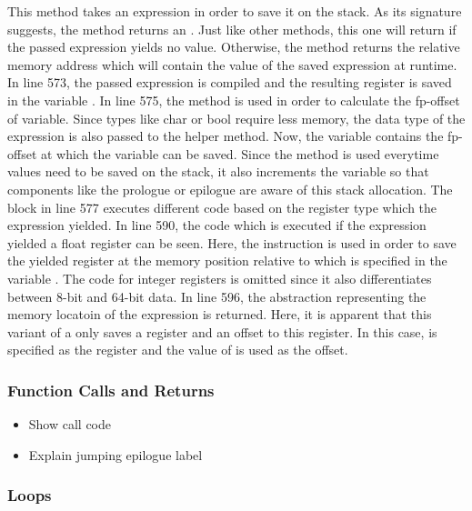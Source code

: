 This method takes an expression in order to save it on the stack.
As its signature suggests, the method returns an .
Just like other methods, this one will return  if the passed expression yields no value.
Otherwise, the method returns the relative memory address which will contain the value of the saved expression at runtime.
In line 573, the passed expression is compiled and the resulting register is saved in the variable .
In line 575, the  method is used in order to calculate the fp-offset of variable.
Since types like char or bool require less memory, the data type of the expression is also passed to the helper method.
Now, the  variable contains the fp-offset at which the variable can be saved.
Since the  method is used everytime values need to be saved on the stack,
it also increments the  variable so that components like the prologue or epilogue are aware of this stack allocation.
The  block in line 577 executes different code based on the register type which the expression yielded.
In line 590, the code which is executed if the expression yielded a float register can be seen.
Here, the  instruction is used in order to save the yielded register at the memory position relative to  which is specified in the variable .
The code for integer registers is omitted since it also differentiates between 8-bit and 64-bit data.
In line 596, the  abstraction representing the memory locatoin of the expression is returned.
Here, it is apparent that this variant of a  only saves a register and an offset to this register.
In this case,  is specified as the register and the value of  is used as the offset.

\subsubsection{Function Calls and Returns}

\begin{itemize}
    \item Show call code
    \item Explain  jumping epilogue label
\end{itemize}

\subsubsection{Loops}

